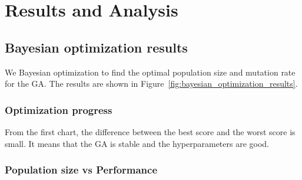 \section{Results and Analysis}
\label{sec:results-analysis}




\subsection{Bayesian optimization results}

We Bayesian optimization to find the optimal population size and mutation rate for the GA. The results are shown in Figure~\ref{fig:bayesian_optimization_results}.

\subsubsection{Optimization progress}

From the first chart, the difference between the best score and the worst score is small. It means that the GA is stable and the hyperparameters are good.

\subsubsection{Population size vs Performance}

